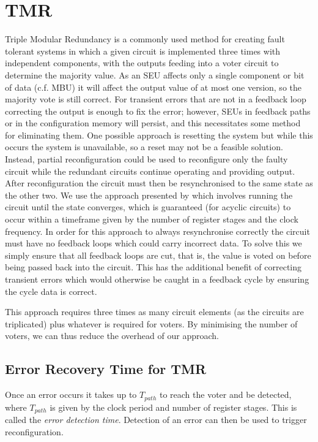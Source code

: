 \documentclass[12pt,final,oneside]{dwThesis} %
\begin{document}
   \section{\gls{TMR}
   }\label{secTMR} Triple Modular Redundancy is a
   commonly used method for creating fault tolerant systems in which a given
   circuit is implemented three times with independent components, with the
   outputs feeding into a voter circuit to determine the majority value. As an
   \gls{SEU} affects only a single component or bit of data (c.f. \gls{MBU}) it
   will affect the output value of at most one version, so the majority vote is
   still correct. For transient errors that are not in a feedback loop correcting
   the output is enough to fix the error; however, \glspl{SEU} in feedback paths
   or in the configuration memory will persist, and this necessitates some method
   for eliminating them. One possible approach is resetting the system but while
   this occurs the system is unavailable, so a reset may not be a feasible
   solution. Instead, partial reconfiguration could be used to reconfigure only
   the faulty circuit while the redundant circuits continue operating and
   providing output. After reconfiguration the circuit must then be resynchronised
   to the same state as the other two. We use the approach presented by
   \cite{DiesselChange} which involves running the circuit until the state
   converges, which is guaranteed (for acyclic circuits) to occur within a
   timeframe given by the number of register stages and the clock frequency. In
   order for this approach to always resynchronise correctly the circuit must have
   no feedback loops which could carry incorrect data. To solve this we simply
   ensure that all feedback loops are \gls{cut}, that is, the value is voted on
   before being passed back into the circuit. This has the additional benefit of
   correcting transient errors which would otherwise be caught in a feedback cycle
   by ensuring the cycle data is correct.

   This approach requires three times as many circuit elements (as the circuits
   are triplicated) plus whatever is required for voters. By minimising the
   number of voters, we can thus reduce the overhead of our approach.

   \subsection{Error Recovery Time for \gls{TMR}
   }

   Once an error occurs it takes up to $T_{path}$ to reach the voter and be
   detected, where $T_{path}$ is given by the clock period and number of
   register stages. This is called the \textit{error detection time}. Detection
   of an error can then be used to trigger reconfiguration.
\end{document}
